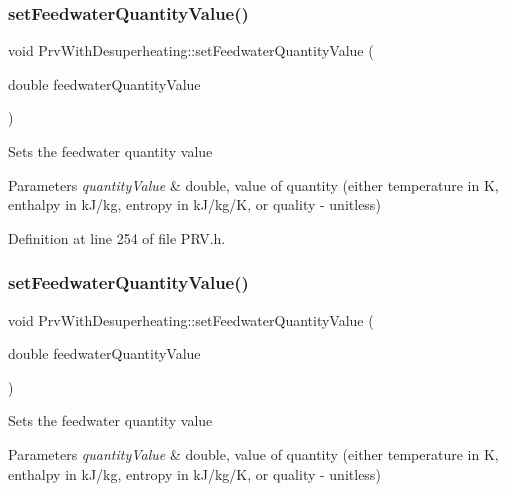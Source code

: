 \subsubsection{\texorpdfstring{set\+Feedwater\+Quantity\+Value()}{setFeedwaterQuantityValue()}\hspace{0.1cm}{\footnotesize\ttfamily [2/3]}}
{\footnotesize\ttfamily void Prv\+With\+Desuperheating\+::set\+Feedwater\+Quantity\+Value (\begin{DoxyParamCaption}\item[{double}]{feedwater\+Quantity\+Value }\end{DoxyParamCaption})\hspace{0.3cm}{\ttfamily [inline]}}

Sets the feedwater quantity value


\begin{DoxyParams}{Parameters}
{\em quantity\+Value} & double, value of quantity (either temperature in K, enthalpy in k\+J/kg, entropy in k\+J/kg/K, or quality -\/ unitless) \\
\hline
\end{DoxyParams}


Definition at line 254 of file P\+R\+V.\+h.

\mbox{\label{class_prv_with_desuperheating_afc17940f7d61898eda1bb4a6f1fea8c3}} 
\subsubsection{\texorpdfstring{set\+Feedwater\+Quantity\+Value()}{setFeedwaterQuantityValue()}\hspace{0.1cm}{\footnotesize\ttfamily [3/3]}}
{\footnotesize\ttfamily void Prv\+With\+Desuperheating\+::set\+Feedwater\+Quantity\+Value (\begin{DoxyParamCaption}\item[{double}]{feedwater\+Quantity\+Value }\end{DoxyParamCaption})\hspace{0.3cm}{\ttfamily [inline]}}

Sets the feedwater quantity value


\begin{DoxyParams}{Parameters}
{\em quantity\+Value} & double, value of quantity (either temperature in K, enthalpy in k\+J/kg, entropy in k\+J/kg/K, or quality -\/ unitless) \\
\hline
\end{DoxyParams}


